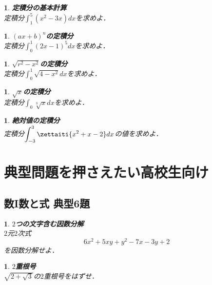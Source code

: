 \documentclass[10pt,
fleqn,
dvipdfmx,
uplatex
]{jsarticle}
\newtheorem{question}[Question]{}
\begin{document}
\begin{question}{\bf\boldmath 定積分の基本計算}\\
定積分$\displaystyle\int_1^5\left(x^2-3x\right)dx$を求めよ．
\end{question}



\begin{question}{\bf\boldmath $\left(ax+b\right)^n$の定積分}\\
定積分$\displaystyle\int_0^1\left(2x-1\right)^5dx$を求めよ．
\end{question}



\begin{question}{\bf\boldmath $\sqrt {r^2-x^2}$の定積分}\\
定積分$\displaystyle\int_0^1\sqrt {4-x^2}dx$を求めよ．
\end{question}



\begin{question}{\bf\boldmath $\sqrt x$の定積分}\\
定積分$\displaystyle\int_0\sqrt[3]xdx$を求めよ．
\end{question}



\begin{question}{\bf\boldmath 絶対値の定積分}\\
定積分$\displaystyle\int_{-3}^3\zettaiti{x^2+x-2}dx$の値を求めよ．
\end{question}

\section{典型問題を押さえたい高校生向け}

\subsection{数I数と式 典型6題}



\begin{question}{\bf\boldmath $2$つの文字含む因数分解}\\
$2$元$2$次式
\[6x^2+5xy+y^2-7x-3y+2\]
を因数分解せよ．
\end{question}



\begin{question}{\bf\boldmath $2$重根号}\\
$\sqrt {2+\sqrt 3}$の$2$重根号をはずせ．
\end{question}
\end{document}
